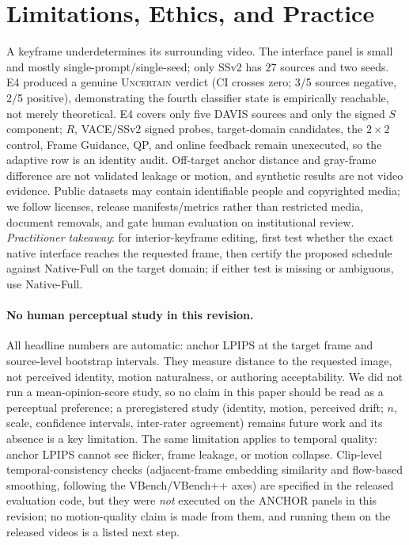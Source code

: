 \documentclass[letterpaper]{article}
\begin{document}
\section{Limitations, Ethics, and Practice}
A keyframe underdetermines its surrounding video. The interface panel is
small and mostly single-prompt/single-seed; only SSv2 has $27$ sources and two
seeds. E4 produced a genuine \textsc{Uncertain} verdict (CI crosses zero; 3/5
sources negative, 2/5 positive), demonstrating the fourth classifier state
is empirically reachable, not merely theoretical. E4 covers only five
DAVIS sources and only the signed $S$ component; $R$, VACE/SSv2 signed
probes, target-domain candidates, the $2{\times}2$ control, Frame
Guidance, QP, and online feedback remain unexecuted, so the adaptive row
is an identity audit.
Off-target anchor distance and gray-frame difference
are not validated leakage or motion, and synthetic results are not video
evidence. Public datasets may contain identifiable people and copyrighted
media; we follow licenses, release manifests/metrics rather than restricted
media, document removals, and gate human evaluation on institutional review.
\emph{Practitioner takeaway}: for interior-keyframe editing, first test
whether the exact native interface reaches the requested frame, then
certify the proposed schedule against Native-Full on the target domain; if
either test is missing or ambiguous, use Native-Full.

\paragraph{No human perceptual study in this revision.}
All headline numbers are automatic: anchor LPIPS at the target frame
and source-level bootstrap intervals. They measure distance to the
requested image, not perceived identity, motion naturalness, or
authoring acceptability. We did not run a mean-opinion-score study, so
no claim in this paper should be read as a perceptual preference; a
preregistered study (identity, motion, perceived drift; $n$, scale,
confidence intervals, inter-rater agreement) remains future work and
its absence is a key limitation. The same limitation applies to
temporal quality: anchor LPIPS cannot see flicker, frame leakage, or
motion collapse. Clip-level temporal-consistency checks (adjacent-frame
embedding similarity and flow-based smoothing, following the
VBench/VBench++ axes) are specified in the released evaluation code,
but they were \emph{not} executed on the ANCHOR panels in this
revision; no motion-quality claim is made from them, and running them
on the released videos is a listed next step.
\end{document}
